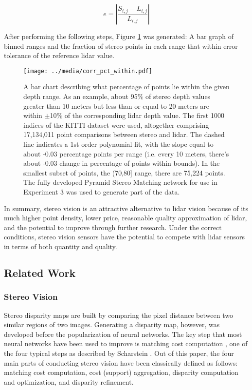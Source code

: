 \begin{equation}
    e = \left | \frac{S_{i,j} - L_{i,j}}{L_{i,j}} \right |
    \label{eq_errCalc}
\end{equation}

After performing the following steps, Figure \ref{corr_pct_within} was generated: A bar graph of binned ranges and the fraction of stereo points in each range that within error tolerance of the reference lidar value.

\begin{figure}[ht]
	\centering
	\texttt{[image: ../media/corr\_pct\_within.pdf]}
	\caption{A bar chart describing what percentage of points lie within the given depth range. As an example, about 95\% of stereo depth values greater than 10 meters but less than or equal to 20 meters are within $\pm$10\% of the corresponding lidar depth value. The first 1000 indices of the KITTI dataset were used, altogether comprising 17,134,011 point comparisons between stereo and lidar. The dashed line indicates a 1st order polynomial fit, with the slope equal to about -0.03 percentage points per range (i.e. every 10 meters, there's about -0.03 change in percentage of points within bounds). In the smallest subset of points, the (70,80] range, there are 75,224 points. The fully developed Pyramid Stereo Matching network for use in Experiment 3 was used to generate part of the data.}
	\label{corr_pct_within}
\end{figure}

In summary, stereo vision is an attractive alternative to lidar vision because of its much higher point density, lower price, reasonable quality approximation of lidar, and the potential to improve through further research. Under the correct conditions, stereo vision sensors have the potential to compete with lidar sensors in terms of both quantity and quality.



\newpage
\subsection{Related Work} %

\subsubsection{Stereo Vision}
Stereo disparity maps are built by comparing the pixel distance between two similar regions of two images. Generating a disparity map, however, was developed before the popularization of neural networks. The key step that most neural networks have been used to improve is matching cost computation \cite{chang_pyramid_2018},  one of the four typical steps as described by Scharstein \cite{scharstein_taxonomy_2002}. Out of this paper, the four main parts of conducting stereo vision have been classically defined as follows: matching cost computation, cost (support) aggregation, disparity computation and optimization, and disparity refinement.

